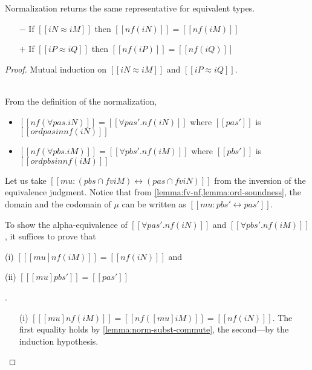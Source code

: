 \begin{lemma}
  \label{lemma:normalization-completeness}
  Normalization returns the same representative for equivalent types.

  \begin{itemize}
  \item[$-$] If $[[iN ≈ iM]]$ then $[[nf(iN)]] = [[nf(iM)]]$
  \item[$+$] If $[[iP ≈ iQ]]$ then $[[nf(iP)]] = [[nf(iQ)]]$
  \end{itemize}
\end{lemma}

\begin{proof}
  Mutual induction on $[[iN ≈ iM]]$ and $[[iP ≈ iQ]]$.
  \begin{caseof}
  \item {\nameref{\ottdruleEOneForallLabel}} \label{case:ord-completeness:forall} \\

    From the definition of the normalization,
    \begin{itemize}
      \item $[[nf(∀pas.iN)]] = [[∀pas'.nf(iN)]]$ where $[[pas']]$ is $[[ord {pas} in nf(iN)]]$
      \item $[[nf(∀pbs.iM)]] = [[∀pbs'.nf(iM)]]$ where $[[pbs']]$ is $[[ord {pbs} in nf(iM)]]$
    \end{itemize}
    Let us take $[[mu : ({pbs} ∩ fv iM) ↔ ({pas} ∩ fv iN)]]$ from the
    inversion of the equivalence judgment. Notice that from
    \cref{lemma:fv-nf,lemma:ord-soundness}, the domain and the codomain of $\mu$ can be written
    as $[[mu : {pbs'} ↔ {pas'}]]$.
    
    To show the alpha-equivalence of $[[∀pas'.nf(iN)]]$ and $[[∀pbs'.nf(iM)]]$,
    it suffices to prove that
    \begin{enumerate*}
    \item[(i)] $[[ [mu] nf(iM) ]] = [[nf(iN)]]$ and \newline
    \item[(ii)] $[[ [mu]pbs' ]] = [[pas']]$
    \end{enumerate*}.
    
    \begin{enumerate}
    \item[(i)] $[[ [mu] nf(iM) ]] = [[nf([mu]iM)]] = [[nf(iN)]]$.
      The first equality holds by \cref{lemma:norm-subst-commute}, the second---by the induction hypothesis.


\end{enumerate}
\end{caseof}
\end{proof}
